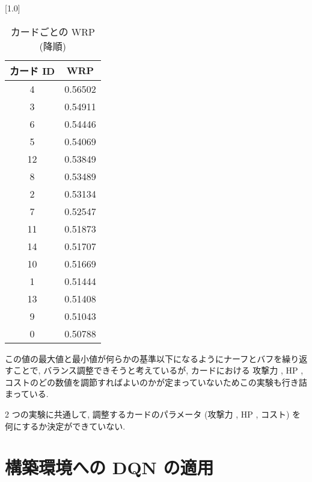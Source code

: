 \documentclass{jarticle}     %
\begin{document}
  \begin{table}[ht]
    \centering
    \caption{カードごとの WRP (降順)}
    \vspace{-0.3cm}
    \label{table:WRP}
    \scalebox{1.0}[1.0]{
      \begin{tabular}{|c|c|}
        \hline
        カード ID  & WRP \\ \hline
        4 & 0.56502 \\ \hline
        3 & 0.54911 \\ \hline
        6 & 0.54446 \\ \hline
        5 & 0.54069 \\ \hline
        12 & 0.53849 \\ \hline
        8 & 0.53489 \\ \hline
        2 & 0.53134 \\ \hline
        7 & 0.52547 \\ \hline
        11 & 0.51873 \\ \hline
        14 & 0.51707 \\ \hline
        10 & 0.51669 \\ \hline
        1 & 0.51444 \\ \hline
        13 & 0.51408 \\ \hline
        9 & 0.51043 \\ \hline
        0 & 0.50788 \\ \hline
        \end{tabular}
    }
    \end{table}
  この値の最大値と最小値が何らかの基準以下になるようにナーフとバフを繰り返すことで, バランス調整できそうと考えているが, カードにおける 攻撃力 , HP , コストのどの数値を調節すればよいのかが定まっていないためこの実験も行き詰まっている.\par
  2 つの実験に共通して, 調整するカードのパラメータ (攻撃力 , HP , コスト) を何にするか決定ができていない. 

\section{構築環境への DQN の適用}
\end{document}
